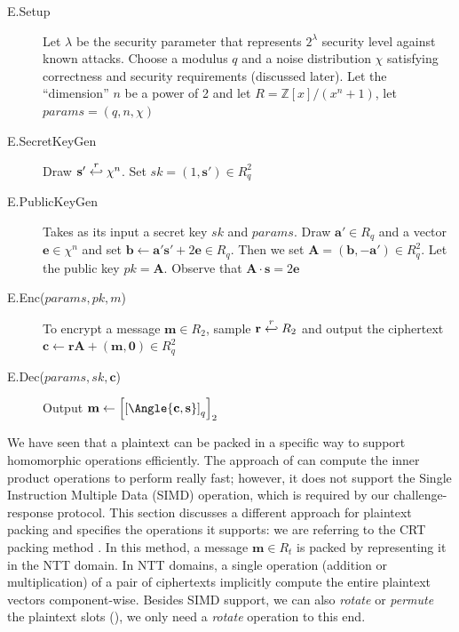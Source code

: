 \begin{description}
\item[E.Setup] Let $\lambda$ be the security parameter that represents
  $2^{\lambda}$ security level against known attacks. Choose a modulus $q$ and a
  noise distribution $\chi$ satisfying correctness and security requirements
  (discussed later). Let the ``dimension'' $n$ be a power of 2 and let
  $R = \mathbb{Z}[x] / (x^{n} + 1)$, let $params = (q, n, \chi)$
\item[E.SecretKeyGen] Draw $\mathbf{s'} \stackrel{r}{\hookleftarrow} \chi^{n}$. Set $sk = (1,\mathbf{s'}) \in R_{q}^{2}$
\item[E.PublicKeyGen] Takes as its input a secret key $sk$ and $params$. Draw
  $\mathbf{a'} \in R_{q}$ and a vector $\mathbf{e} \in \chi^{n}$ and set
  $\mathbf{b} \gets \mathbf{a's'} + 2\mathbf{e} \in R_{q}$. Then we set
  $\mathbf{A} = (\mathbf{b}, -\mathbf{a'}) \in R_{q}^{2}$. Let the public key
  $pk = \mathbf{A}$. Observe that $\mathbf{A} \cdot \mathbf{s} = 2\mathbf{e}$
\item[E.Enc($params, pk, m$)] To encrypt a message $\mathbf{m} \in R_{2}$,
  sample $\mathbf{r} \stackrel{r}{\hookleftarrow} R_{2}$ and output the ciphertext
  $\mathbf{c} \gets \mathbf{r}\mathbf{A} + \mathbf{(m,0)} \in R_{q}^{2}$
\item[E.Dec($params,sk,\mathbf{c}$)] Output
  $\mathbf{m} \gets
  \left[\left[\Angle{\mathbf{c},\mathbf{s}}\right]_{q}\right]_{2}$
\end{description}

We have seen that a plaintext can be packed in a specific way to support
homomorphic operations efficiently. The approach of \cite{yasuda2014practical}
can compute the inner product operations to perform really fast; however, it
does not support the Single Instruction Multiple Data (SIMD) operation, which is
required by our challenge-response protocol. This section discusses a different
approach for plaintext packing and specifies the operations it supports: we are
referring to the CRT packing method \cite{smart2014fully}. In this method, a
message \(\mathbf{m} \in R_{t}\) is packed by representing it in the NTT
domain. In NTT domains, a single operation (addition or multiplication) of a
pair of ciphertexts implicitly compute the entire plaintext vectors
component-wise. Besides SIMD support, we can also \textit{rotate} or
\textit{permute} the plaintext slots (\cite{gentry2012fully}), we only need a
\textit{rotate} operation to this end.


